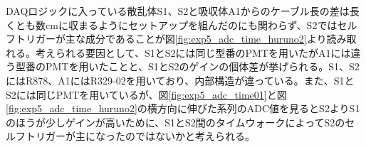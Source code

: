 \documentclass[../../main.tex]{subfiles}
\numberwithin{equation}{section}
\numberwithin{table}{section}
\numberwithin{figure}{section}
\begin{document}
    DAQロジックに入っている散乱体S1、S2と吸収体A1からのケーブル長の差は長くとも数cmに収まるようにセットアップを組んだのにも関わらず、S2ではセルフトリガーが主な成分であることが図\ref{fig:exp5_adc_time_huruno2}より読み取れる。考えられる要因として、S1とS2には同じ型番のPMTを用いたがA1には違う型番のPMTを用いたことと、S1とS2のゲインの個体差が挙げられる。S1、S2にはR878、A1にはR329-02を用いており、内部構造が違っている。また、S1とS2には同じPMTを用いているが、図\ref{fig:exp5_adc_time01}と図\ref{fig:exp5_adc_time_huruno2}の横方向に伸びた系列のADC値を見るとS2よりS1のほうが少しゲインが高いために、S1とS2間のタイムウォークによってS2のセルフトリガーが主になったのではないかと考えられる。
 
\end{document}
